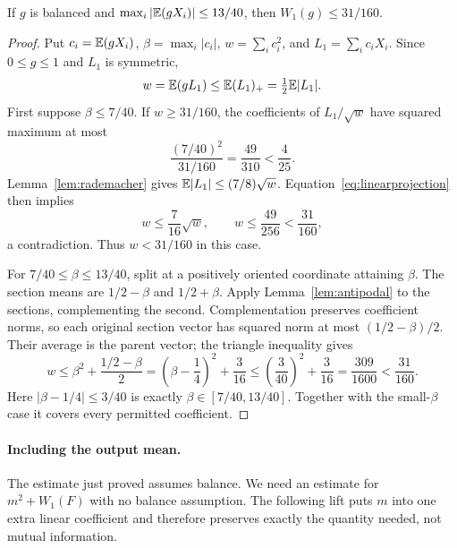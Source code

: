 \begin{lemma}\label{lem:balancedcap}
If $g$ is balanced and $\max_i|\mathbb E(gX_i)|\le13/40$, then $W_1(g)\le31/160$.
\end{lemma}
\begin{proof}
Put $c_i=\mathbb E(gX_i)$, $\beta=\max_i|c_i|$, $w=\sum_i c_i^2$, and $L_1=\sum_i c_iX_i$. Since $0\le g\le1$ and $L_1$ is symmetric,
\begin{equation}\label{eq:linearprojection}
w=\mathbb E(gL_1)\le\mathbb E(L_1)_+=\tfrac12\mathbb E|L_1|.
\end{equation}
First suppose $\beta\le7/40$. If $w\ge31/160$, the coefficients of $L_1/\sqrt w$ have squared maximum at most
\[
\frac{(7/40)^2}{31/160}=\frac{49}{310}<\frac4{25}.
\]
Lemma~\ref{lem:rademacher} gives $\mathbb E|L_1|\le(7/8)\sqrt w$. Equation~\eqref{eq:linearprojection} then implies
\[
w\le\frac7{16}\sqrt w,\qquad w\le\frac{49}{256}<\frac{31}{160},
\]
a contradiction. Thus $w<31/160$ in this case.

For $7/40\le\beta\le13/40$, split at a positively oriented coordinate attaining $\beta$. The section means are $1/2-\beta$ and $1/2+\beta$. Apply Lemma~\ref{lem:antipodal} to the sections, complementing the second. Complementation preserves coefficient norms, so each original section vector has squared norm at most $(1/2-\beta)/2$. Their average is the parent vector; the triangle inequality gives
\begin{equation}\label{eq:sectioncap}
w\le\beta^2+\frac{1/2-\beta}{2}
=\left(\beta-\frac14\right)^2+\frac3{16}
\le\left(\frac3{40}\right)^2+\frac3{16}
=\frac{309}{1600}<\frac{31}{160}.
\end{equation}
Here $|\beta-1/4|\le3/40$ is exactly $\beta\in[7/40,13/40]$. Together with the small-$\beta$ case it covers every permitted coefficient.

\end{proof}
\paragraph{Including the output mean.} The estimate just proved assumes balance. We need an estimate for $m^2+W_1(F)$ with no balance assumption. The following lift puts $m$ into one extra linear coefficient and therefore preserves exactly the quantity needed, not mutual information.

